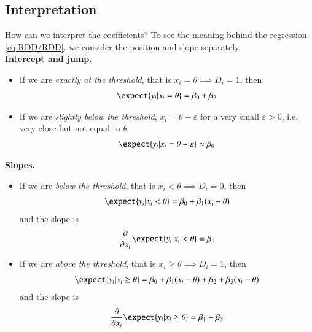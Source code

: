         \subsection{Interpretation}
            How can we interpret the coefficients? To see the meaning behind the regression \eqref{eq:RDD/RDD}. we consider the position and slope separately.\\
            
            \noindent\textbf{Intercept and jump.}
            \begin{itemize}
                \item If we are \textit{exactly at the threshold}, that is $x_i = \theta \implies D_i = 1$, then
                \begin{align}
                    \expect{y_i | x_i = \theta} = \beta_0 + \beta_2
                \end{align}
                
                \item If we are \textit{slightly below the threshold}, $x_i = \theta -\varepsilon$ for a very small $\varepsilon>0$, i.e. very close but not equal to $\theta$
                \begin{align}
                    \expect{y_i\lvert x_i = \theta - \varepsilon} \approx \beta_0
                \end{align}
            \end{itemize}
            \noindent\textbf{Slopes.}
            \begin{itemize}
                \item If we are \textit{below the threshold}, that is $x_i < \theta\implies D_i=0$, then
                \begin{align}
                    \expect{y_i | x_i < \theta} = \beta_0 + \beta_1 (x_i-\theta)
                \end{align}
                and the slope is
                \begin{align}
                    \pdv*{\expect{y_i|x_i<\theta}}{x_i}= \beta_1
                \end{align}

                \item If we are \textit{above the threshold}, that is $x_i\geq \theta\implies D_i = 1$, then
                \begin{align}
                    \expect{y_i | x_i \geq\theta} = \beta_0 + \beta_1 (x_i-\theta) + \beta_2 + \beta_3 (x_i-\theta)
                \end{align}
                and the slope is
                \begin{align}
                    \pdv*{\expect{y_i|x_i\geq\theta}}{x_i}= \beta_1 + \beta_3
                \end{align}
            \end{itemize}



